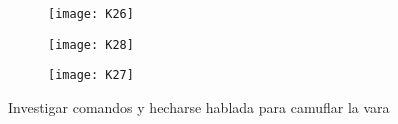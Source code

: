 \documentclass{article}
\begin{document}
\begin{itemize}
\begin{figure}[H]
\centerline{\texttt{[image: K26]}}
\caption{}
\label{fig}
\end{figure}

\begin{figure}[H]
\centerline{\texttt{[image: K28]}}
\caption{}
\label{fig}
\end{figure}

\begin{figure}[H]
\centerline{\texttt{[image: K27]}}
\caption{}
\label{fig}
\end{figure}



Investigar comandos y hecharse hablada para camuflar la vara












\end{itemize}
\end{document}
